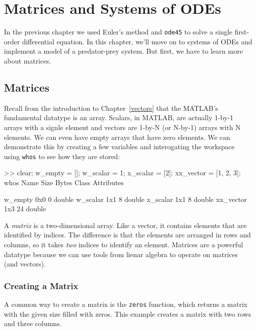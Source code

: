 \chapter{Matrices and Systems of ODEs}
\label{systems}


In the previous chapter we used Euler's method and \lstinline{ode45} to solve a single first-order differential equation.  In this chapter, we'll move on to systems of ODEs and implement a model of a predator-prey system.  But first, we have to learn more about matrices.


\section{Matrices}

Recall from the introduction to Chapter~\ref{vectors} that the MATLAB's fundamental datatype is an array.  Scalars, in MATLAB, are actually 1-by-1 arrays with a signle element and vectors are 1-by-N (or N-by-1) arrays with N elements.  We can even have empty arrays that have zero elements. We can demonstrate this by creating a few variables and interogating the workspace using \lstinline{whos} to see how they are stored:

\begin{code}
     >> clear;
     w_empty = [];
     w_scalar = 1;
     x_scalar = [2];
     xx_vector = [1, 2, 3];
     whos
       Name           Size            Bytes  Class     Attributes
     
       w_empty        0x0                 0  double              
       w_scalar       1x1                 8  double              
       x_scalar       1x1                 8  double              
       xx_vector      1x3                24  double    
\end{code}

A \emph{matrix} is a two-dimensional array.  Like a vector,
it contains elements that are identified by indices.  The difference
is that the elements are arranged in rows and columns, so it takes
\emph{two} indices to identify an element.  Matrices are a powerful datatype because we can use tools from lienar algebra to operate on matrices (and vectors).  

\subsection{Creating a Matrix}


A common way to create a matrix is the \lstinline{zeros} function,
which returns a matrix with the given size filled with zeros.
This example creates a matrix with two rows and three columns.

